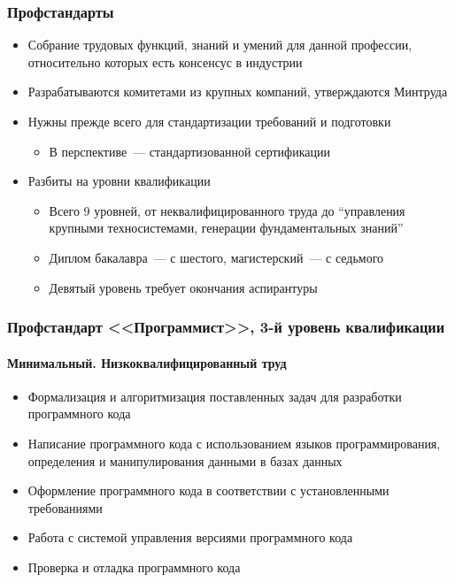 \documentclass{../../slides-style}
\begin{document}
    \begin{frame}
        \frametitle{Профстандарты}
        \begin{itemize}
            \item Собрание трудовых функций, знаний и умений для данной профессии, относительно которых есть консенсус в индустрии
            \item Разрабатываются комитетами из крупных компаний, утверждаются Минтруда
            \item Нужны прежде всего для стандартизации требований и подготовки
            \begin{itemize}
                \item В перспективе~--- стандартизованной сертификации
            \end{itemize}
            \item Разбиты на уровни квалификации
            \begin{itemize}
                \item Всего 9 уровней, от неквалифицированного труда до ``управления крупными техносистемами, генерации фундаментальных знаний''
                \item Диплом бакалавра~--- с шестого, магистерский~--- с седьмого
                \item Девятый уровень требует окончания аспирантуры
            \end{itemize}
        \end{itemize}
    \end{frame}

    \begin{frame}
        \frametitle{Профстандарт <<Программист>>, 3-й уровень квалификации}
        \framesubtitle{Минимальный. Низкоквалифицированный труд}
        \begin{itemize}
            \item Формализация и алгоритмизация поставленных задач для разработки программного кода
            \item Написание программного кода с использованием языков программирования, определения и манипулирования данными в базах данных
            \item Оформление программного кода в соответствии с установленными требованиями
            \item Работа с системой управления версиями программного кода
            \item Проверка и отладка программного кода
        \end{itemize}
    \end{frame}
\end{document}
